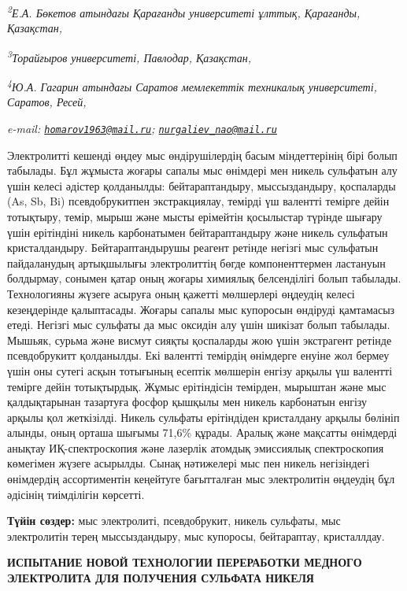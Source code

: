 \emph{\textsuperscript{2}Е.А. Бөкетов атындағы Қарағанды университеті
ұлттық, Қарағанды, Қазақстан,}

\emph{\textsuperscript{3}Торайғыров университеті, Павлодар, Қазақстан,}

\emph{\textsuperscript{4}Ю.А. Гагарин атындағы Саратов мемлекеттік
техникалық университеті, Саратов, Ресей,}

\emph{e-mail:
\href{mailto:homarov1963@mail.ru}{\nolinkurl{homarov1963@mail.ru}};
\href{mailto:nurgaliev_nao@mail.ru}{\nolinkurl{nurgaliev\_nao@mail.ru}}}

Электролитті кешенді өңдеу мыс өндірушілердің басым міндеттерінің бірі
болып табылады. Бұл жұмыста жоғары сапалы мыс өнімдері мен никель
сульфатын алу үшін келесі әдістер қолданылды: бейтараптандыру,
мыссыздандыру, қоспаларды (As, Sb, Bi) псевдобрукитпен экстракциялау,
темірді үш валентті темірге дейін тотықтыру, темір, мырыш және мысты
ерімейтін қосылыстар түрінде шығару үшін ерітіндіні никель карбонатымен
бейтараптандыру және никель сульфатын кристалдандыру. Бейтараптандырушы
реагент ретінде негізгі мыс сульфатын пайдаланудың артықшылығы
электролиттің бөгде компоненттермен ластануын болдырмау, сонымен қатар
оның жоғары химиялық белсенділігі болып табылады. Технологияны жүзеге
асыруға оның қажетті мөлшерлері өңдеудің келесі кезеңдерінде
қалыптасады. Жоғары сапалы мыс купоросын өндіруді қамтамасыз етеді.
Негізгі мыс сульфаты да мыс оксидін алу үшін шикізат болып табылады.
Мышьяк, сурьма және висмут сияқты қоспаларды жою үшін экстрагент ретінде
псевдобрукитт қолданылды. Екі валентті темірдің өнімдерге енуіне жол
бермеу үшін оны сутегі асқын тотығының есептік мөлшерін енгізу арқылы үш
валентті темірге дейін тотықтырдық. Жұмыс ерітіндісін темірден, мырыштан
және мыс қалдықтарынан тазартуға фосфор қышқылы мен никель карбонатын
енгізу арқылы қол жеткізілді. Никель сульфаты ерітіндіден кристалдану
арқылы бөлініп алынды, оның орташа шығымы 71,6\% құрады. Аралық және
мақсатты өнімдерді анықтау ИҚ-спектроскопия және лазерлік атомдық
эмиссиялық спектроскопия көмегімен жүзеге асырылды. Сынақ нәтижелері мыс
пен никель негізіндегі өнімдердің ассортиментін кеңейтуге бағытталған
мыс электролитін өңдеудің бұл әдісінің тиімділігін көрсетті.

{\bfseries Түйін сөздер:} мыс электролиті, псевдобрукит, никель сульфаты,
мыс электролитін терең мыссыздандыру, мыс купоросы, бейтараптау,
кристаллдау.

{\bfseries ИСПЫТАНИЕ НОВОЙ ТЕХНОЛОГИИ ПЕРЕРАБОТКИ МЕДНОГО ЭЛЕКТРОЛИТА ДЛЯ
ПОЛУЧЕНИЯ СУЛЬФАТА НИКЕЛЯ}

